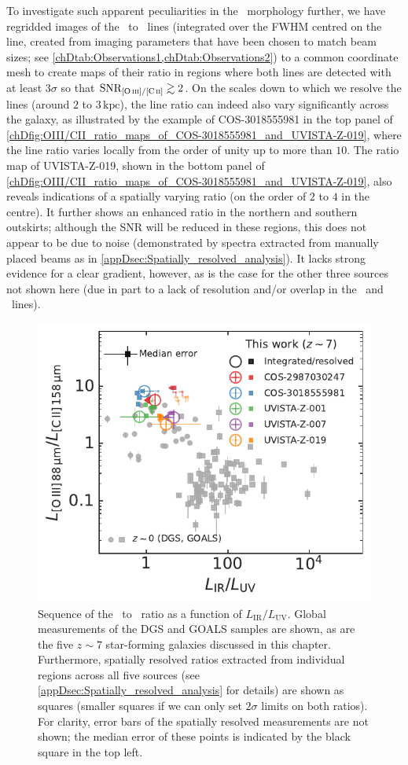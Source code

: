 To investigate such apparent peculiarities in the \OIIIf\ morphology further, we have regridded images of the \OIIILam\ to \CIILam\ lines (integrated over the FWHM centred on the line, created from imaging parameters that have been chosen to match beam sizes; see \cref{chDtab:Observations1,chDtab:Observations2}) to a common coordinate mesh to create maps of their ratio in regions where both lines are detected with at least $3 \sigma$ so that $\text{SNR}_{\OIIIf/\CII} \gtrsim 2$. On the scales down to which we resolve the lines (around $2$ to $3 \, \mathrm{kpc}$), the line ratio can indeed also vary significantly across the galaxy, as illustrated by the example of COS-3018555981 in the top panel of \cref{chDfig:OIII/CII_ratio_maps_of_COS-3018555981_and_UVISTA-Z-019}, where the line ratio varies locally from the order of unity up to more than $10$. The ratio map of UVISTA-Z-019, shown in the bottom panel of \cref{chDfig:OIII/CII_ratio_maps_of_COS-3018555981_and_UVISTA-Z-019}, also reveals indications of a spatially varying ratio (on the order of $2$ to $4$ in the centre). It further shows an enhanced ratio in the northern and southern outskirts; although the SNR will be reduced in these regions, this does not appear to be due to noise (demonstrated by spectra extracted from manually placed beams as in \cref{appDsec:Spatially_resolved_analysis}). It lacks strong evidence for a clear gradient, however, as is the case for the other three sources not shown here (due in part to a lack of resolution and/or overlap in the \OIIIf\ and \CII\ lines).
\begin{figure}
    \centering
    \includegraphics[width=0.6\linewidth]{"Plots/ChapterD/L_IR_L_UV_peak_UV_cont_luminosity_ratios"}
    \caption[Spatially resolved sequence of \OIIILam\ to \CIILam\ ratio as a function of $L_\text{IR}/L_\text{UV}$.]{Sequence of the \OIIILam\ to \CIILam\ ratio as a function of $L_\text{IR}/L_\text{UV}$. Global measurements of the DGS and GOALS samples are shown, as are the five $z \sim 7$ star-forming galaxies discussed in this chapter. Furthermore, spatially resolved ratios extracted from individual regions across all five sources (see \cref{appDsec:Spatially_resolved_analysis} for details) are shown as squares (smaller squares if we can only set $2 \sigma$ limits on both ratios). For clarity, error bars of the spatially resolved measurements are not shown; the median error of these points is indicated by the black square in the top left.
    }
    \label{chDfig:Spatially_resolved_OIII/CII_vs_L_IR/L_UV_sequence}
\end{figure}

